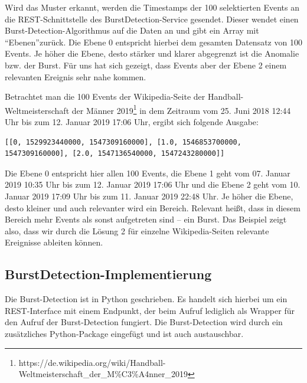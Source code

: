 Wird das Muster erkannt, werden die Timestamps der 100 selektierten Events an die REST-Schnittstelle des BurstDetection-Service gesendet.
Dieser wendet einen Burst-Detection-Algorithmus auf die Daten an und gibt ein Array mit \textquotedblleft Ebenen\textquotedblright zurück.
Die Ebene 0 entspricht hierbei dem gesamten Datensatz von 100 Events. Je höher die Ebene, desto stärker und klarer abgegrenzt ist die
Anomalie bzw. der Burst. Für uns hat sich gezeigt, dass Events aber der Ebene 2 einem relevanten Ereignis sehr nahe kommen.

Betrachtet man die 100 Events der Wikipedia-Seite der Handball-Weltmeisterschaft der Männer 2019\footnote{https://de.wikipedia.org/wiki/Handball-Weltmeisterschaft\newline{}\_der\_M\%C3\%A4nner\_2019}
in dem Zeitraum vom 25. Juni 2018 12:44 Uhr bis zum 12. Januar 2019 17:06 Uhr, ergibt sich folgende Ausgabe:

\begin{lstlisting}[label=Solution2_Layers,caption=Ebene 0\, 1 und 2 der Burst-Detectionen,language=epl,firstnumber=1,captionpos=b]
[[0, 1529923440000, 1547309160000], [1.0, 1546853700000, 1547309160000], [2.0, 1547136540000, 1547243280000]]
\end{lstlisting}

Die Ebene 0 entspricht hier allen 100 Events, die Ebene 1 geht vom 07. Januar 2019 10:35 Uhr bis zum 12. Januar 2019 17:06 Uhr und die
Ebene 2 geht vom 10. Januar 2019 17:09 Uhr bis zum 11. Januar 2019 22:48 Uhr. Je höher die Ebene, desto kleiner und auch
relevanter wird ein Bereich. Relevant heißt, dass in diesem Bereich mehr Events als sonst aufgetreten sind -- ein Burst.
Das Beispiel zeigt also, dass wir durch die Lösung 2 für einzelne Wikipedia-Seiten relevante Ereignisse ableiten können.

\subsection{BurstDetection-Implementierung}
Die Burst-Detection ist in Python geschrieben. Es handelt sich hierbei um ein REST-Interface mit einem Endpunkt,
der beim Aufruf lediglich als Wrapper für den Aufruf der Burst-Detection fungiert. Die Burst-Detection wird durch ein
zusätzliches Python-Package eingefügt und ist auch austauschbar.
